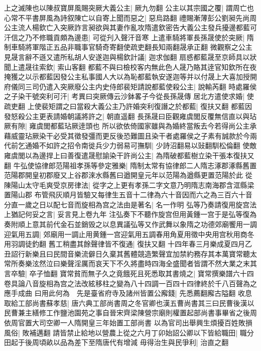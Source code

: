 上之滅陳也以陳叔寶屏風賜突厥大義公主|{
	厥九勿翻}
公主以其宗國之覆|{
	謂周亡也}
心常不平書屏風為詩叙陳亡以自寄上聞而惡之|{
	惡烏路翻}
禮賜漸薄彭公劉昶先尚周公主流人楊欽亡入突厥詐言昶欲與其妻作亂攻隋遣欽密告大義公主發兵擾邊都藍可汗信之乃不修職貢頗為邊患|{
	可從刋入聲汗音寒}
上遣車騎將軍長孫晟使於突厥|{
	隋制車騎將軍階正五品非職事官騎奇寄翻使疏吏翻長知兩翻晟承正翻}
微觀察之公主見晟言辭不遜又遣所私胡人安遂迦與楊欽計議|{
	迦求伽翻}
扇惑都藍晟至京師具以狀聞上遣晟往索欽|{
	索山客翻}
都藍不與曰檢校客内無此色人晟乃賂其逹官知欽所在夜掩獲之以示都藍因發公主私事國人大以為恥都藍執安遂迦等并以付晟上大喜加授開府儀同三司仍遣入突厥廢公主内史侍郎裴矩請說都藍使殺公主|{
	說輸芮翻}
時處羅侯之子染干號突利可汗|{
	考異曰突厥傳云沙鉢畧子今從長孫晟傳}
居北方遣使求婚|{
	使疏吏翻}
上使裴矩謂之曰當殺大義公主乃許婚突利復譖之於都藍|{
	復扶又翻}
都藍因發怒殺公主更表請婚朝議將許之|{
	朝直遥翻}
長孫晟曰臣觀雍虞閭反覆無信直以與玷厥有隙|{
	雍虞閭都藍玷厥逹頭也}
所以欲依倚國家雖與為婚終當叛去今若得尚公主承藉威靈玷厥染干必受其徵發彊而更反後恐難圖且染干者處羅侯之子素有誠款於今兩代前乞通婚不如許之招令南徙兵少力弱易可撫馴|{
	少詩沼翻易以䜴翻馴松倫翻}
使敵雍虞閭以為邊捍上曰善復遣晟慰諭染干許尚公主|{
	為隋破都藍樹立染干張本復扶又翻}
牛弘使協律郎范陽祖孝孫等參定雅樂|{
	隋制太常有協律郎二人隋志涿郡涿縣舊置范陽郡開皇初郡廢又上谷郡淶水縣舊曰遒開皇元年以范陽為遒縣更置范陽於此}
從陳陽山太守毛爽受京房律法|{
	從字之上更有孝孫二字文意乃明隋志南海郡含洭縣梁置陽山郡}
布管飛灰順月皆驗又每律生五音十二律為六十音因而六之為三百六十音分直一歲之日以配七音而旋相為宫之法由是著名|{
	名一作明}
弘等乃奏請復用旋宫法上猶記何妥之言|{
	妥言見上卷九年}
注弘奏下不聽作旋宫但用黃鍾一宫于是弘等復為奏附順上意其前代金石並銷毁之以息異議弘等又作武舞以象隋之功德郊廟饗用一調迎氣用五調|{
	郊廟用一調止用黄鍾一宫迎氣用五調春用角夏用徵中央用宫秋用商冬用羽調徒釣翻}
舊工稍盡其餘聲律皆不復通|{
	復扶又翻}
十四年春三月樂成夏四月乙丑詔行新樂且曰民間音樂流僻日久棄其舊體競造繁聲宜加禁約務存其本萬寶常聽太常所奏樂泫然泣曰樂聲淫厲而哀天下不久將盡時四海全盛聞者皆謂不然大業之末其言卒驗|{
	卒子恤翻}
寶常貧而無子久之竟餓死且死悉取其書燒之|{
	寶常撰樂譜六十四卷具論八音旋相為宫之法改絃移柱之變為八十四調一百四十四律終於千八百聲為之應手成曲}
曰用此何為　先是臺省府寺及諸州皆置公廨錢|{
	先悉薦翻廨古隘翻}
收息取給工部尚書蘇孝慈|{
	唐六典工部尚書周之冬官卿也漢五曹尚書其三曰民曹後漢以民曹兼主繕修工作鹽池園苑之事自晉宋齊梁陳營宗廟則權置起部尚書事畢省之後周依周官置大司空卿一人隋開皇三年始置工部尚書}
以為官司出舉興生煩擾百姓敗損風俗|{
	敗補邁翻}
請皆禁止給地以營農上從之六月丁卯始詔公卿以下皆給職田|{
	職分田起于後周頃畝以品為差下至隋唐代有增減}
毋得治生與民爭利|{
	治直之翻}
